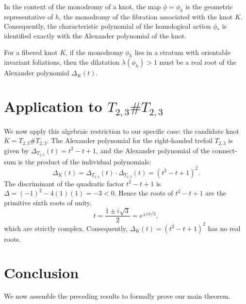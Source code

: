 In the context of the monodromy of a knot, the map $\phi = \phi_h$ is the geometric representative of $h$, the monodromy of the fibration associated with the knot $K$. Consequently, the characteristic polynomial of the homological action $\phi_*$ is identified exactly with the Alexander polynomial of the knot.

\begin{corollary}
\label{cor:alexander_root}
For a fibered knot $K$, if the monodromy $\phi_h$ lies in a stratum with orientable invariant foliations, then the dilatation $\lambda(\phi_h) > 1$ must be a real root of the Alexander polynomial $\Delta_K(t)$.
\end{corollary}

\section{Application to \texorpdfstring{$T_{2,3} \# T_{2,3}$}{T(2,3) \# T(2,3)}}

We now apply this algebraic restriction to our specific case: the candidate knot $K = T_{2,3} \# T_{2,3}$. The Alexander polynomial for the right-handed trefoil $T_{2,3}$ is given by $\Delta_{T_{2,3}}(t) = t^2 - t + 1$, and the Alexander polynomial of the connect-sum is the product of the individual polynomials:
\begin{equation}
\Delta_{K}(t) = \Delta_{T_{2,3}}(t) \cdot \Delta_{T_{2,3}}(t) = (t^2 - t + 1)^2.
\end{equation}
The discriminant of the quadratic factor $t^2 - t + 1$ is $\Delta = (-1)^2 - 4(1)(1) = -3 < 0$. Hence the roots of $t^2 - t + 1$ are the primitive sixth roots of unity,
\[
t = \frac{1 \pm i\sqrt{3}}{2} = e^{\pm i\pi/3},
\]
which are strictly complex. Consequently, $\Delta_K(t) = (t^2-t+1)^2$ has no real roots.

\section{Conclusion}

We now assemble the preceding results to formally prove our main theorem.


